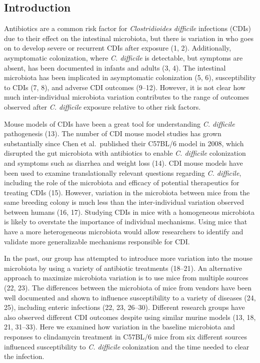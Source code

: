 \documentclass[
  11pt,
]{article}
\begin{document}
\newpage

\hypertarget{introduction}{%
\subsection{Introduction}\label{introduction}}

Antibiotics are a common risk factor for \emph{Clostridioides difficile}
infections (CDIs) due to their effect on the intestinal microbiota, but
there is variation in who goes on to develop severe or recurrent CDIs
after exposure (1, 2). Additionally, asymptomatic colonization, where
\emph{C. difficile} is detectable, but symptoms are absent, has been
documented in infants and adults (3, 4). The intestinal microbiota has
been implicated in asymptomatic colonization (5, 6), susceptibility to
CDIs (7, 8), and adverse CDI outcomes (9--12). However, it is not clear
how much inter-individual microbiota variation contributes to the range
of outcomes observed after \emph{C. difficile} exposure relative to
other risk factors.

Mouse models of CDIs have been a great tool for understanding \emph{C.
difficile} pathogenesis (13). The number of CDI mouse model studies has
grown substantially since Chen et al.~published their C57BL/6 model in
2008, which disrupted the gut microbiota with antibiotics to enable
\emph{C. difficile} colonization and symptoms such as diarrhea and
weight loss (14). CDI mouse models have been used to examine
translationally relevant questions regarding \emph{C. difficile},
including the role of the microbiota and efficacy of potential
therapeutics for treating CDIs (15). However, variation in the
microbiota between mice from the same breeding colony is much less than
the inter-individual variation observed between humans (16, 17).
Studying CDIs in mice with a homogeneous microbiota is likely to
overstate the importance of individual mechanisms. Using mice that have
a more heterogeneous microbiota would allow researchers to identify and
validate more generalizable mechanisms responsible for CDI.

In the past, our group has attempted to introduce more variation into
the mouse microbiota by using a variety of antibiotic treatments
(18--21). An alternative approach to maximize microbiota variation is to
use mice from multiple sources (22, 23). The differences between the
microbiota of mice from vendors have been well documented and shown to
influence susceptibility to a variety of diseases (24, 25), including
enteric infections (22, 23, 26--30). Different research groups have also
observed different CDI outcomes despite using similar murine models (13,
18, 21, 31--33). Here we examined how variation in the baseline
microbiota and responses to clindamycin treatment in C57BL/6 mice from
six different sources influenced susceptibility to \emph{C. difficile}
colonization and the time needed to clear the infection.
\end{document}
